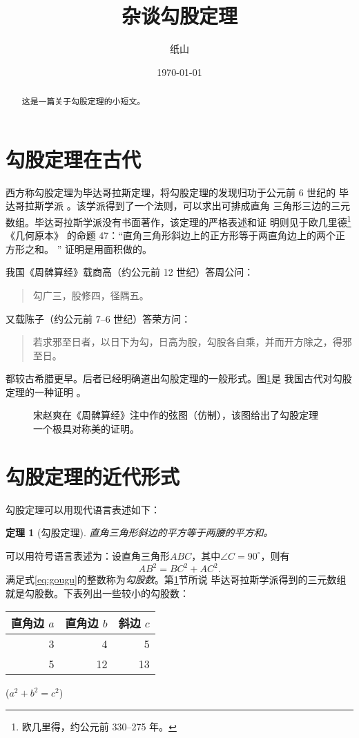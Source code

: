 \documentclass[UTF8]{ctexart}
\title{\heiti 杂谈勾股定理}
\author{\kaishu 纸山}
\date{\today}
\newenvironment{myquote}
{\begin{quote}\kaishu\zihao{-5}}
{\end{quote}}
\newcommand\degree{^\circ}
\newtheorem{thm}{定理}
\begin{document}
    
    \maketitle
    \begin{abstract}
        这是一篇关于勾股定理的小短文。
    \end{abstract}
    \tableofcontents
    \section{勾股定理在古代}\label{sec:diyijie}
    西方称勾股定理为毕达哥拉斯定理，将勾股定理的发现归功于公元前 6 世纪的
    毕达哥拉斯学派 \cite{Kline}。该学派得到了一个法则，可以求出可排成直角
    三角形三边的三元数组。毕达哥拉斯学派没有书面著作，该定理的严格表述和证
    明则见于欧几里德\footnote{欧几里得，约公元前 330--275 年。}《几何原本》
    的命题 47：“直角三角形斜边上的正方形等于两直角边上的两个正方形之和。 ” 
    证明是用面积做的。
    
    我国《周髀算经》载商高（约公元前 12 世纪）答周公问：
    \begin{myquote}
        勾广三，股修四，径隅五。
    \end{myquote}
    又载陈子（约公元前 7--6 世纪）答荣方问：
    \begin{myquote}
        若求邪至日者，以日下为勾，日高为股，勾股各自乘，并而开方除之，得邪至日。
    \end{myquote}
    都较古希腊更早。后者已经明确道出勾股定理的一般形式。图\ref{fig:xiantu}是
    我国古代对勾股定理的一种证明 \cite{quanjing}。
    \begin{figure}[ht]
        \centering
        \caption{宋赵爽在《周髀算经》注中作的弦图（仿制），该图给出了勾股定理一个极具对称美的证明。 }
        \label{fig:xiantu}
    \end{figure}
    \section{勾股定理的近代形式}
    勾股定理可以用现代语言表述如下：
    \begin{thm}[勾股定理]
        直角三角形斜边的平方等于两腰的平方和。
    \end{thm}

    可以用符号语言表述为：设直角三角形$ABC$，其中$\angle C = 90\degree$，则有
    \begin{equation}\label{eq:gougu}
    AB^2 = BC^2 + AC^2.
    \end{equation}
    满足式\eqref{eq:gougu}的整数称为\emph{勾股数}。第\ref{sec:diyijie}节所说
    毕达哥拉斯学派得到的三元数组就是勾股数。下表列出一些较小的勾股数：
    \begin{table}[H]
        \begin{tabular}{|rrr|}
            \hline
            直角边 $a$ & 直角边 $b$ & 斜边 $c$ \\
            \hline
            3 & 4 & 5 \\
            5 & 12 & 13 \\
            \hline
        \end{tabular}%
        \qquad
        ($a^2 + b^2 = c^2$)
    \end{table}
    \nocite{Shiye}
    
\end{document}
